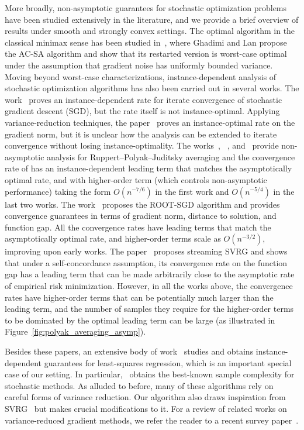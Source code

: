 \documentclass[11pt,twoside]{article}
\numberwithin{equation}{section}
\newcommand{\1}{\mathbf{1}}
\theoremstyle{remark}
\theoremstyle{plain}
\begin{document}
More broadly, non-asymptotic guarantees for stochastic optimization problems have been studied extensively in the literature, and we provide a brief overview of results under smooth and strongly convex settings. The optimal algorithm in the classical minimax sense has been studied in~\cite{ghadimi2012optimal,ghadimi2013optimal}, where Ghadimi and Lan propose the AC-SA algorithm and show that its restarted version is worst-case optimal under the assumption that gradient noise has uniformly bounded variance. Moving beyond worst-case characterizations, instance-dependent analysis of stochastic optimization algorithms has also been carried out in several works. The work~\cite{nguyen2019new} proves an instance-dependent rate for iterate convergence of stochastic gradient descent (SGD), but the rate itself is not instance-optimal. Applying variance-reduction techniques, the paper~\cite{nguyen2021inexact} proves an instance-optimal rate on the gradient norm, but it is unclear how the analysis can be extended to iterate convergence without losing instance-optimality. The works~\cite{moulines2011non}, ~\cite{xu2011towards}, and~\cite{gadat2017optimal} provide non-asymptotic analysis for Ruppert--Polyak--Juditsky averaging and the convergence rate of has an instance-dependent leading term that matches the asymptotically optimal rate, and with higher-order term (which controls non-asymptotic performance) taking the form $O(n^{-7/6})$ in the first work and $O(n^{-5/4})$ in the last two works.  The work~\cite{li2022root} proposes the ROOT-SGD algorithm and provides convergence guarantees in terms of gradient norm, distance to solution, and function gap. All the convergence rates have leading terms that match the asymptotically optimal rate, and higher-order terms scale as $O(n^{-3/2})$, improving upon early works. The paper~\cite{frostig2015competing} proposes streaming SVRG and shows that under a self-concordance assumption, its convergence rate on the function gap has a leading term that can be made arbitrarily close to the asymptotic rate of empirical risk minimization. However, in all the works above, the convergence rates have higher-order terms that can be potentially much larger than the leading term, and the number of samples they require for the higher-order terms to be dominated by the optimal leading term can be large (as illustrated in Figure~\ref{fig:polyak_averaging_asymp}).

Besides these papers, an extensive body of work~\cite{defossez2015averaged,dieuleveut2016nonparametric, jain2018parallelizing,jain2018accelerating} studies and obtains instance-dependent guarantees for least-squares regression, which is an important special case of our setting. In particular,~\cite{jain2018accelerating} obtains the best-known sample complexity for stochastic methods.
As alluded to before, many of these algorithms rely on careful forms of variance reduction.
Our algorithm also draws inspiration from SVRG~\cite{johnson2013accelerating} but makes crucial modifications to it. For a review of related works on variance-reduced gradient methods, we refer the reader to a recent survey paper~\cite{gower2020variance}.
\end{document}
